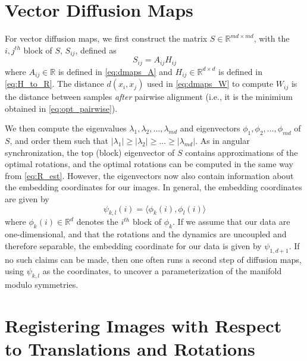 \documentclass{pnastwo}
\begin{document}
\begin{article}
\begin{materials}
\section{Vector Diffusion Maps \cite{singer2012vector}}

For vector diffusion maps, we first construct the matrix $S \in \mathbb{R}^{md \times md}$, with the $i,j^{th}$ block of $S$, $S_{ij}$, defined as
\begin{equation}
	S_{ij} = A_{ij} H_{ij}
\end{equation}
%
where $A_{ij} \in \mathbb{R}$ is defined in \eqref{eq:dmaps_A} and $H_{ij} \in \mathbb{R}^{d \times d}$ is defined in \eqref{eq:H_to_R}.
%
The distance $d(x_i, x_j)$ used in \eqref{eq:dmaps_W} to compute $W_{ij}$ is the distance between samples {\em after} pairwise alignment (i.e., it is the minimium obtained in \eqref{eq:opt_pairwise}). 

We then compute the eigenvalues $\lambda_1, \lambda_2, \dots, \lambda_{md}$ and eigenvectors $\phi_1, \phi_2, \dots, \phi_{md}$ of $S$, and order them such that $|\lambda_1| \ge |\lambda_2| \ge \dots \ge |\lambda_{md}|$.
%
As in angular synchronization, the top (block) eigenvector of $S$ contains approximations of the optimal rotations, and the optimal rotations can be computed in the same way from \eqref{eq:R_est}.
%
However, the eigenvectors now also contain information about the embedding coordinates for our images.
%
In general, the embedding coordinates are given by 
\begin{equation}
\psi_{k,l} (i) = \langle \phi_k(i), \phi_l(i) \rangle
\end{equation}
where $\phi_k(i) \in \mathbb{R}^d$ denotes the $i^{th}$ block of $\phi_k$.
%
If we assume that our data are one-dimensional, and that the rotations and the dynamics are uncoupled and therefore separable, the embedding coordinate for our data %
is given by $\psi_{1,d+1}$.
%
If no such claims can be made, then one often runs a second step of diffusion maps, using $\psi_{k,l}$ as the coordinates, to uncover a parameterization of the manifold modulo symmetries.

\section{Registering Images with Respect to Translations and Rotations} \label{subsec:trans_rot_register}


\end{materials}
\end{article}
\end{document}
